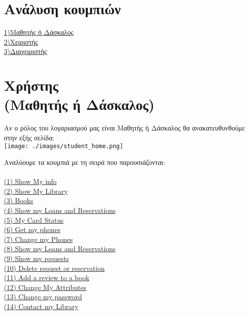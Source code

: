 \documentclass[14pt]{report}
\begin{document}
	\newpage
	\hypertarget{Buttons}{}
	\chapter*{\Large Ανάλυση κουμπιών}
	\hyperlink{student-anchor-buttons}{\Large 1)Μαθητής ή Δάσκαλος} \\
	\hyperlink{operator-anchor-buttons}{\Large 2)Χειριστής} \\ 
	\hyperlink{admin-anchor-buttons}{\Large 3)Διαχειριστής} \\
	
	\newpage
	\hypertarget{student-anchor-buttons}{}
	\chapter*{\Large Χρήστης \\(Μαθητής ή Δάσκαλος)}
	Αν ο ρόλος του λογαριασμού  μας είναι Μαθητής ή Δάσκαλος θα ανακατευθυνθούμε στην εξής σελίδα: \\
	\texttt{[image: ./images/student\_home.png]}
	
	\newpage
	Αναλύουμε τα κουμπιά με τη σειρά που παρουσιάζονται: \\ \\
	\hyperlink{s-show-my-info}{(1) Show My info} \\
	\hyperlink{s-show-my-library}{(2) Show My Library} \\
	\hyperlink{s-books}{(3) Books} \\
	\hyperlink{s-past-loans}{(4) Show my Loans and Reservations} \\
	\hyperlink{s-card-status}{(5) My Card Status} \\
	\hyperlink{s-get-phones}{(6) Get my phones} \\
	\hyperlink{s-change-phones}{(7) Change my Phones} \\
	\hyperlink{s-show-loans}{(8) Show my Loans and Reservations} \\
	\hyperlink{s-show-requests}{(9) Show my requests} \\
	\hyperlink{s-delete}{(10) Delete request or reservation} \\
	\hyperlink{s-review}{(11) Add a review to a book} \\
	\hyperlink{s-change-attribute}{(12) Change My Attributes} \\
	\hyperlink{s-change-password}{(13) Change my password} \\
	\hyperlink{s-contact-library}{(14) Contact my Library}
	
\end{document}
